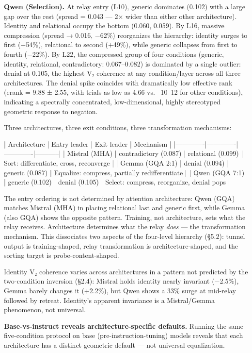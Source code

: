 \documentclass[12pt]{article}
\begin{document}
\textbf{Qwen (Selection).} At relay entry (L10), generic dominates (0.102) with a large gap over the rest (spread = 0.043 — 2× wider than either other architecture). Identity and relational occupy the bottom (0.060, 0.059). By L16, massive compression (spread → 0.016, −62\%) reorganizes the hierarchy: identity surges to first (+54\%), relational to second (+49\%), while generic collapses from first to fourth (−22\%). By L22, the compressed group of four conditions (generic, identity, relational, contradictory: 0.067–0.082) is dominated by a single outlier: denial at 0.105, the highest V₂ coherence at any condition/layer across all three architectures. The denial spike coincides with dramatically low effective rank (erank = 9.88 ± 2.55, with trials as low as 4.66 vs. ~10–12 for other conditions), indicating a spectrally concentrated, low-dimensional, highly stereotyped geometric response to negation.

Three architectures, three exit conditions, three transformation mechanisms:

| Architecture | Entry leader | Exit leader | Mechanism |
|-------------|-------------|-------------|-----------|
| Mistral (MHA) | contradictory (0.087) | relational (0.099) | Sort: differentiate, cross, reconverge |
| Gemma (GQA 2:1) | denial (0.094) | generic (0.087) | Equalize: compress, partially redifferentiate |
| Qwen (GQA 7:1) | generic (0.102) | denial (0.105) | Select: compress, reorganize, denial pops |

The entry ordering is not determined by attention architecture: Qwen (GQA) matches Mistral (MHA) in placing relational last and generic first, while Gemma (also GQA) shows the opposite pattern. Training, not architecture, sets what the relay receives. Architecture determines what the relay \textit{does} — the transformation mechanism. This dissociates two aspects of the four-level hierarchy (§5.2): tunnel output is training-shaped, relay transformation is architecture-shaped, and the sorting target is probe-content-shaped.

Identity V₂ coherence varies across architectures in a pattern not predicted by the two-condition inversion (§2.4): Mistral holds identity nearly invariant (−2.5\%), Gemma barely changes it (+2.2\%), but Qwen shows a 33\% surge at mid-relay followed by retreat. Identity's apparent invariance is a Mistral/Gemma phenomenon, not universal.

\textbf{Base-vs-instruct reveals architecture-specific defaults.} Running the same five-condition protocol on base (pre-instruction-tuning) models reveals that each architecture has a distinct geometric default — not universal equalization.
\end{document}
